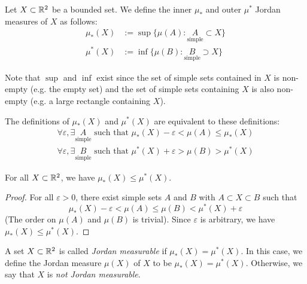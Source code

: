 \begin{definition}
    Let $X\subset \mathbb{R}^2$ be a bounded set. We define the inner $\mu_*$ and outer $\mu^*$ Jordan measures of $X$ as follows:
    \begin{align*}
        \mu_*(X) &:= \sup\{\mu(A) : \underset{\text{simple}}{A} \subset X\} \\
        \mu^*(X) &:= \inf\{\mu(B) : \underset{\text{simple}}{B} \supset X\}
    \end{align*}
\end{definition}

\begin{remark}
    Note that $\sup$ and $\inf$ exist since the set of simple sets contained in $X$ is non-empty (e.g. the empty set) and the set of simple sets containing $X$ is also non-empty (e.g. a large rectangle containing $X$).
\end{remark}

\begin{remark}
    The definitions of $\mu_*(X)$ and $\mu^*(X)$ are equivalent to these definitions:
    \begin{align*}
        \forall \varepsilon, \exists \underset{\text{simple}}{A} \text{ such that } \mu_*(X) - \varepsilon < \mu(A) \leq \mu_*(X) \\
        \forall \varepsilon, \exists \underset{\text{simple}}{B} \text{ such that } \mu^*(X) + \varepsilon > \mu(B) > \mu^*(X)
    \end{align*}
\end{remark}

\begin{remark}
    For all $X\subset \mathbb{R}^2$, we have $\mu_*(X) \leq \mu^*(X)$.
\end{remark}
\begin{proof}
    For all $\varepsilon>0$, there exist simple sets $A$ and $B$ with $A\subset X \subset B$ such that 
    \[
        \mu_*(X) - \varepsilon < \mu(A) \leq \mu(B) < \mu^*(X) + \varepsilon
    \]
    (The order on $\mu(A)$ and $\mu(B)$ is trivial). Since $\varepsilon$ is arbitrary, we have $\mu_*(X) \leq \mu^*(X)$.
\end{proof}

\begin{definition}
    A set $X\subset \mathbb{R}^2$ is called \textit{Jordan measurable} if $\mu_*(X) = \mu^*(X)$. In this case, we define the Jordan measure $\mu(X)$ of $X$ to be $\mu_*(X) = \mu^*(X)$. Otherwise, we say that $X$ is \textit{not Jordan measurable}.
\end{definition}

